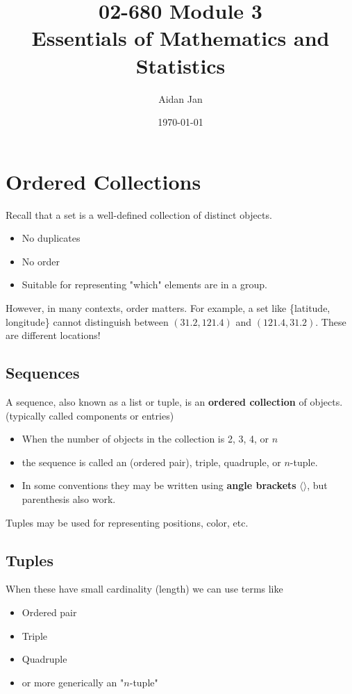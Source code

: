 \documentclass[10pt]{article}
\title{02-680 Module 3 \\ \large{Essentials of Mathematics and Statistics}}
\author{Aidan Jan}
\date{\today}
\begin{document}
\maketitle

\section*{Ordered Collections}
Recall that a set is a well-defined collection of distinct objects.
\begin{itemize}
	\item No duplicates
	\item No order
	\item Suitable for representing "which" elements are in a group.
\end{itemize}
However, in many contexts, order matters.  For example, a set like \{latitude, longitude\} cannot distinguish between $(31.2, 121.4)$ and $(121.4, 31.2)$.  These are different locations!

\subsection*{Sequences}
A sequence, also known as a list or tuple, is an \textbf{ordered collection} of objects.  (typically called components or entries)
\begin{itemize}
	\item When the number of objects in the collection is 2, 3, 4, or $n$
	\item the sequence is called an (ordered pair), triple, quadruple, or $n$-tuple.
	\item In some conventions they may be written using \textbf{angle brackets} $\langle \rangle$, but parenthesis also work.
\end{itemize}
Tuples may be used for representing positions, color, etc.

\subsection*{Tuples}
When these have small cardinality (length) we can use terms like
\begin{itemize}
	\item Ordered pair
	\item Triple
	\item Quadruple
	\item or more generically an "$n$-tuple"
\end{itemize}
\end{document}
